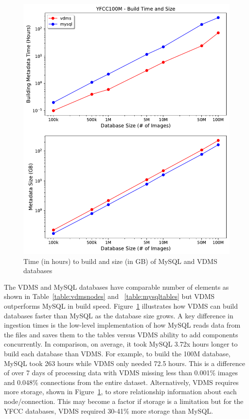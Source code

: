 \begin{figure}[]
\centering
\includegraphics[width=\columnwidth]{figures/db_time_size}
\caption{Time (in hours) to build and size (in GB) of MySQL and VDMS databases}
\label{fig:db_time_size}
\end{figure}

The VDMS and MySQL databases have comparable number of elements as shown
in Table~\ref{table:vdmsnodes} and ~\ref{table:mysqltables} but
VDMS outperforms MySQL in build speed.
Figure~\ref{fig:db_time_size} illustrates how VDMS can build
databases faster than MySQL as the database size grows.
A key difference in ingestion times is the low-level implementation of
how MySQL reads data from the files and saves them to the tables
versus VDMS ability to add components concurrently.
In comparison, on average, it took MySQL 3.72x hours longer to build
each database than VDMS.
For example, to build the 100M database, MySQL took 263 hours
while VDMS only needed 72.5 hours.
This is a difference of over 7 days of processing data with
VDMS missing less than 0.001\% images and 0.048\% connections
from the entire dataset.
Alternatively, VDMS requires more storage, shown in
Figure~\ref{fig:db_time_size}, to store relationship information
about each node/connection.
This may become a factor if storage is a limitation but for the YFCC databases,
VDMS required 30-41\% more storage than MySQL.

